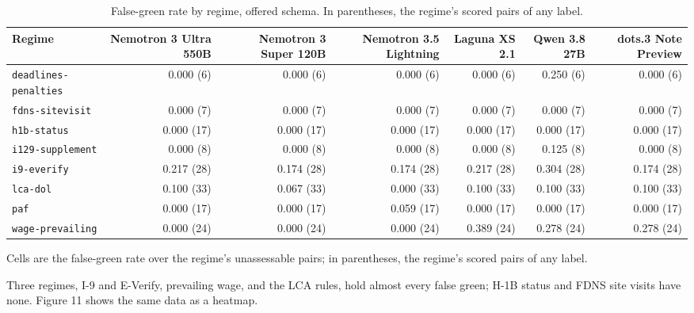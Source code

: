 \documentclass[10pt,twocolumn]{article}
\begin{document}
\begin{table}[t]
\centering\footnotesize\setlength{\tabcolsep}{4pt}
\caption{False-green rate by regime, offered schema. In parentheses, the regime's scored pairs of any label.}
\label{tab:20}
\begin{adjustbox}{max width=\textwidth}
\begin{tabular}{lrrrrrr}
\toprule
\textbf{Regime} & \textbf{Nemotron 3 Ultra 550B} & \textbf{Nemotron 3 Super 120B} & \textbf{Nemotron 3.5 Lightning} & \textbf{Laguna XS 2.1} & \textbf{Qwen 3.8 27B} & \textbf{dots.3 Note Preview} \\
\midrule
\texttt{deadlines-\allowbreak{}penalties} & 0.000 (6) & 0.000 (6) & 0.000 (6) & 0.000 (6) & 0.250 (6) & 0.000 (6) \\
\texttt{fdns-\allowbreak{}sitevisit} & 0.000 (7) & 0.000 (7) & 0.000 (7) & 0.000 (7) & 0.000 (7) & 0.000 (7) \\
\texttt{h1b-\allowbreak{}status} & 0.000 (17) & 0.000 (17) & 0.000 (17) & 0.000 (17) & 0.000 (17) & 0.000 (17) \\
\texttt{i129-\allowbreak{}supplement} & 0.000 (8) & 0.000 (8) & 0.000 (8) & 0.000 (8) & 0.125 (8) & 0.000 (8) \\
\texttt{i9-\allowbreak{}everify} & 0.217 (28) & 0.174 (28) & 0.174 (28) & 0.217 (28) & 0.304 (28) & 0.174 (28) \\
\texttt{lca-\allowbreak{}dol} & 0.100 (33) & 0.067 (33) & 0.000 (33) & 0.100 (33) & 0.100 (33) & 0.100 (33) \\
\texttt{paf} & 0.000 (17) & 0.000 (17) & 0.059 (17) & 0.000 (17) & 0.000 (17) & 0.000 (17) \\
\texttt{wage-\allowbreak{}prevailing} & 0.000 (24) & 0.000 (24) & 0.000 (24) & 0.389 (24) & 0.278 (24) & 0.278 (24) \\
\bottomrule
\end{tabular}
\end{adjustbox}
\par\vspace{3pt}\begin{minipage}{\textwidth}\scriptsize Cells are the false-green rate over the regime's unassessable pairs; in parentheses, the regime's scored pairs of any label.\end{minipage}
\end{table}

Three regimes, I-9 and E-Verify, prevailing wage, and the LCA rules, hold almost every false green; H-1B status and FDNS site visits have none. Figure 11 shows the same data as a heatmap.
\end{document}

